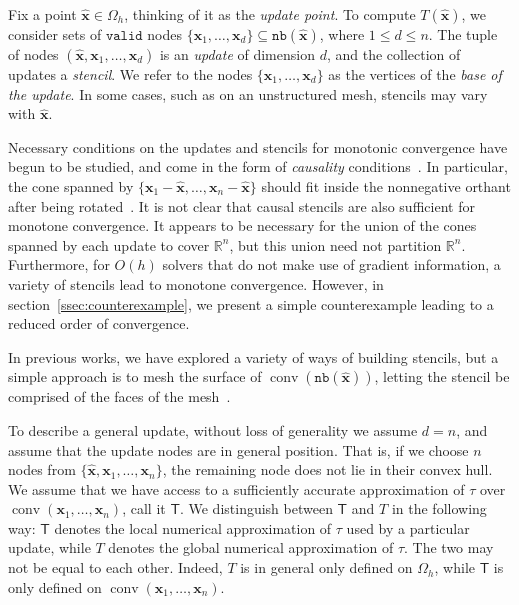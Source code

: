 \documentclass{siamart190516}
\newcommand{\m}[1]{\boldsymbol{#1}}
\newcommand{\nb}{\texttt{nb}}
\newcommand{\valid}{\texttt{valid}}
\newcommand{\xhat}{\hat{\m{x}}}
\DeclareMathOperator{\conv}{conv}
\begin{document}
Fix a point $\hat{\m{x}} \in \Omega_h$, thinking of it as the
\emph{update point}. To compute $T(\hat{\m{x}})$, we consider sets of
$\valid$ nodes
$\{\m{x}_1, \hdots, \m{x}_d\} \subseteq \nb(\hat{\m{x}})$, where
$1 \leq d \leq n$. The tuple of nodes
$(\hat{\m{x}}, \m{x}_1, \hdots, \m{x}_d)$ is an \emph{update} of
dimension $d$, and the collection of updates a \emph{stencil}. We
refer to the nodes $\{\m{x}_1, \hdots, \m{x}_d\}$ as the vertices of
the \emph{base of the update}. In some cases, such as on an
unstructured mesh, stencils may vary with $\xhat$.

Necessary conditions on the updates and stencils for monotonic
convergence have begun to be studied, and come in the form of
\emph{causality} conditions~\cite{Kimmel:1998aa}. In particular, the
cone spanned by $\{\m{x}_1 - \xhat, \hdots, \m{x}_n - \xhat\}$ should
fit inside the nonnegative orthant after being
rotated~\cite{Sethian:2000aa,Sethian:2003aa}. It is not clear that
causal stencils are also sufficient for monotone convergence. It
appears to be necessary for the union of the cones spanned by each
update to cover $\mathbb{R}^n$, but this union need not partition
$\mathbb{R}^n$. Furthermore, for $O(h)$ solvers that do not make use
of gradient information, a variety of stencils lead to monotone
convergence. However, in section~\ref{ssec:counterexample}, we present
a simple counterexample leading to a reduced order of convergence.

In previous works, we have explored a variety of ways of building
stencils, but a simple approach is to mesh the surface of
$\conv(\nb(\hat{\m{x}}))$, letting the stencil be comprised of the
faces of the mesh~\cite{Potter:2019ab,Yang:2019aa}.

To describe a general update, without loss of generality we assume
$d = n$, and assume that the update nodes are in general
position. That is, if we choose $n$ nodes from
$\{\hat{\m{x}}, \m{x}_1, \hdots, \m{x}_n\}$, the remaining node does
not lie in their convex hull. We assume that we have access to a
sufficiently accurate approximation of $\tau$ over
$\conv(\m{x}_1, \hdots, \m{x}_n)$, call it $\mathsf{T}$. We
distinguish between $\mathsf{T}$ and $T$ in the following way:
$\mathsf{T}$ denotes the local numerical approximation of $\tau$ used
by a particular update, while $T$ denotes the global numerical
approximation of $\tau$. The two may not be equal to each
other. Indeed, $T$ is in general only defined on $\Omega_h$, while
$\mathsf{T}$ is only defined on $\conv(\m{x}_1, \hdots, \m{x}_n)$.
\end{document}
